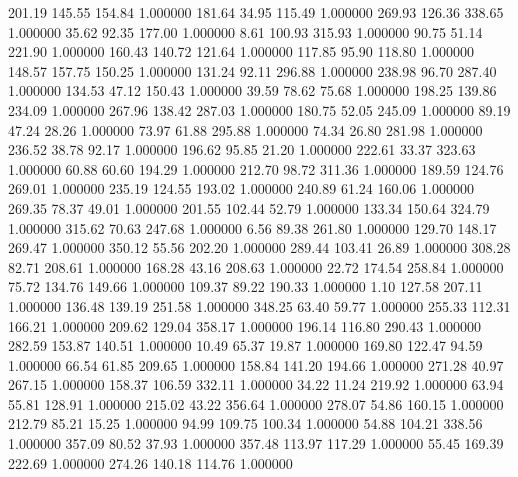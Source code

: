     201.19    145.55    154.84  1.000000
    181.64     34.95    115.49  1.000000
    269.93    126.36    338.65  1.000000
     35.62     92.35    177.00  1.000000
      8.61    100.93    315.93  1.000000
     90.75     51.14    221.90  1.000000
    160.43    140.72    121.64  1.000000
    117.85     95.90    118.80  1.000000
    148.57    157.75    150.25  1.000000
    131.24     92.11    296.88  1.000000
    238.98     96.70    287.40  1.000000
    134.53     47.12    150.43  1.000000
     39.59     78.62     75.68  1.000000
    198.25    139.86    234.09  1.000000
    267.96    138.42    287.03  1.000000
    180.75     52.05    245.09  1.000000
     89.19     47.24     28.26  1.000000
     73.97     61.88    295.88  1.000000
     74.34     26.80    281.98  1.000000
    236.52     38.78     92.17  1.000000
    196.62     95.85     21.20  1.000000
    222.61     33.37    323.63  1.000000
     60.88     60.60    194.29  1.000000
    212.70     98.72    311.36  1.000000
    189.59    124.76    269.01  1.000000
    235.19    124.55    193.02  1.000000
    240.89     61.24    160.06  1.000000
    269.35     78.37     49.01  1.000000
    201.55    102.44     52.79  1.000000
    133.34    150.64    324.79  1.000000
    315.62     70.63    247.68  1.000000
      6.56     89.38    261.80  1.000000
    129.70    148.17    269.47  1.000000
    350.12     55.56    202.20  1.000000
    289.44    103.41     26.89  1.000000
    308.28     82.71    208.61  1.000000
    168.28     43.16    208.63  1.000000
     22.72    174.54    258.84  1.000000
     75.72    134.76    149.66  1.000000
    109.37     89.22    190.33  1.000000
      1.10    127.58    207.11  1.000000
    136.48    139.19    251.58  1.000000
    348.25     63.40     59.77  1.000000
    255.33    112.31    166.21  1.000000
    209.62    129.04    358.17  1.000000
    196.14    116.80    290.43  1.000000
    282.59    153.87    140.51  1.000000
     10.49     65.37     19.87  1.000000
    169.80    122.47     94.59  1.000000
     66.54     61.85    209.65  1.000000
    158.84    141.20    194.66  1.000000
    271.28     40.97    267.15  1.000000
    158.37    106.59    332.11  1.000000
     34.22     11.24    219.92  1.000000
     63.94     55.81    128.91  1.000000
    215.02     43.22    356.64  1.000000
    278.07     54.86    160.15  1.000000
    212.79     85.21     15.25  1.000000
     94.99    109.75    100.34  1.000000
     54.88    104.21    338.56  1.000000
    357.09     80.52     37.93  1.000000
    357.48    113.97    117.29  1.000000
     55.45    169.39    222.69  1.000000
    274.26    140.18    114.76  1.000000
